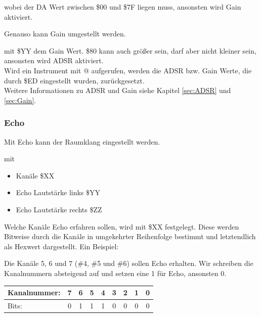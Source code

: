 \medskip

wobei der DA Wert zwischen \$00 und \$7F liegen muss, ansonsten wird Gain aktiviert.

\bigskip

Genauso kann Gain umgestellt werden.

\medskip



\medskip

mit \$YY dem Gain Wert. \$80 kann auch größer sein, darf aber nicht kleiner sein, ansonsten wird ADSR aktiviert. \\

Wird ein Instrument mit @ aufgerufen, werden die ADSR bzw. Gain Werte, die durch \$ED eingestellt wurden, zurückgesetzt. \\
Weitere Informationen zu ADSR und Gain siehe Kapitel \ref{sec:ADSR} und \ref{sec:Gain}.

\subsubsection{Echo}

Mit Echo kann der Raumklang eingestellt werden.

\medskip



\medskip

mit

\begin{itemize}
	\item Kanäle \$XX
	\item Echo Lautstärke links \$YY
	\item Echo Lautstärke rechts \$ZZ
\end{itemize}

Welche Kanäle Echo erfahren sollen, wird mit \$XX festgelegt. Diese werden Bitweise durch die Kanäle in umgekehrter Reihenfolge bestimmt und letztendlich als Hexwert dargestellt. Ein Beispiel:

\bigskip

Die Kanäle 5, 6 und 7 (\#4, \#5 und \#6) sollen Echo erhalten. Wir schreiben die Kanalnummern absteigend auf und setzen eine 1 für Echo, ansonsten 0.

\begin{table}[htbp]
	\centering
	\begin{tabularx}{8.5cm}{|X|c|c|c|c|c|c|c|c|}
		\hline
		Kanalnummer: & 7 & 6 & 5 & 4 & 3 & 2 & 1 & 0 \\
		\hline
		Bits: & 0 & 1 & 1 & 1 & 0 & 0 & 0 & 0 \\
		\hline
	\end{tabularx}
\end{table}



